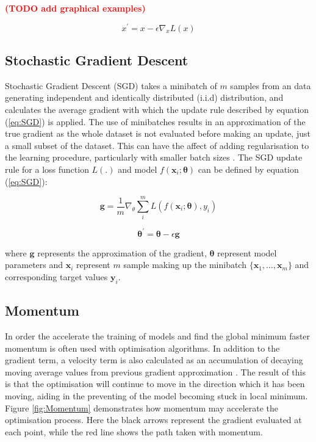 \textcolor{red}{\textbf{(TODO add graphical examples)}}

\begin{equation}\label{eq:gradient_descent}
   x^\prime = x - \epsilon \nabla_x L(x)
\end{equation}

\subsection{Stochastic Gradient Descent}
Stochastic Gradient Descent (SGD) takes a minibatch of $m$ samples from an  data generating independent and identically distributed (i.i.d) distribution, and calculates the average gradient with which the update rule described by equation (\ref{eq:SGD}) is applied.
The use of minibatches results in an approximation of the true gradient as the whole dataset is not evaluated before making an update, just a small subset of the dataset.
This can have the affect of adding regularisation to the learning procedure, particularly with smaller batch sizes \cite{Goodfellow-et-al-2016}.
The SGD update rule for a loss function $L(.)$ and model $f(\bm{x}_i; \bm{\theta})$ can be defined by equation (\ref{eq:SGD}):

\begin{equation*}
    \bm{g} = \frac{1}{m} \nabla_\theta \sum_i^m L(f(\bm{x}_i; \bm{\theta}), y_i)
\end{equation*}

\begin{equation}\label{eq:SGD}
    \bm{\theta}^\prime = \bm{\theta} - \epsilon \bm{g}
\end{equation}

where $\bm{g}$ represents the approximation of the gradient, $\bm{\theta}$ represent model parameters and $\bm{x}_i$ represent $m$ sample making up the minibatch $\{\bm{x}_1, \dots, \bm{x}_m\}$ and corresponding target values $\bm{y}_i$.

\subsection{Momentum}
In order the accelerate the training of models and find the global minimum faster momentum is often used with optimisation algorithms.
In addition to the gradient term, a velocity term is also calculated as an accumulation of decaying moving average values from previous gradient approximation \cite{Goodfellow-et-al-2016}.
The result of this is that the optimisation will continue to move in the direction which it has been moving, aiding in the preventing of the model becoming stuck in local minimum.
Figure \ref{fig:Momentum} demonstrates how momentum may accelerate the optimisation process.
Here the black arrows represent the gradient evaluated at each point, while the red line shows the path taken with momentum.

